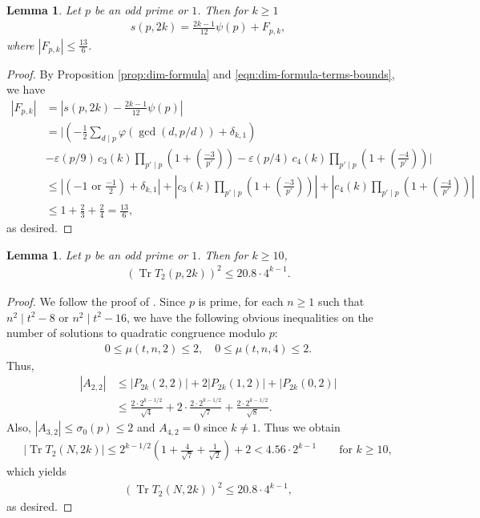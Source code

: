 \documentclass[11pt,letterpaper,reqno]{amsart}
\numberwithin{figure}{section}
\numberwithin{table}{section}
\theoremstyle{definition}
\theoremstyle{plain}
\newcommand{\lrabs}[1]{\left\lvert #1 \right\lvert}
\newcommand{\lrp}[1]{\left(#1\right)}
\newtheorem{lemma}[theorem]{Lemma}
\theoremstyle{definition}
\theoremstyle{definition}
\theoremstyle{remark}
\numberwithin{equation}{section}
\DeclareMathOperator{\Tr}{Tr}
\begin{document}
\begin{lemma} \label{lem:primedimension}
    Let $p$ be an odd prime or $1$. Then for $k\ge1$
    \begin{align}
        s(p,2k)=\frac{2k-1}{12}\psi(p)+F_{p,k},
    \end{align}
    where $|F_{p,k}|\le\frac{13}{6}$.
\end{lemma}
\begin{proof}
    By Proposition \ref{prop:dim-formula} and \eqref{eqn:dim-formula-terms-bounds}, we have
    \begin{align}
        |F_{p,k}| &= \lrabs{s(p,2k) - \frac{2k-1}{12} \psi(p)} \\
        &= \Bigg| \lrp{-\frac12  \sum_{d\mid p} \varphi(\gcd(d,p/d)) + \delta_{k,1}} \\
        & - \varepsilon(p/9)\, c_3(k) \prod_{p' \mid p} \lrp{1 + \lrp{\frac{-3}{p'}} } 
        - \varepsilon(p/4)\, c_4(k) \prod_{p' \mid p} \lrp{1 + \lrp{\frac{-4}{p'}} } \Bigg| \\
        &\leq \lrabs{\lrp{-1 \text{ or } \frac{-1}{2}} + \delta_{k,1}} + \lrabs{c_3(k) \prod_{p' \mid p} \lrp{1 + \lrp{\frac{-3}{p'}} } } + \lrabs{ c_4(k) \prod_{p' \mid p} \lrp{1 + \lrp{\frac{-4}{p'}} } } \\
        &\leq 1 + \frac23 + \frac24 = \frac{13}{6},
    \end{align}
    as desired.
\end{proof}
    


\begin{lemma} \label{lem:primeT2}
    Let $p$ be an odd prime or $1$. Then for $k\ge10$, 
    \begin{align}
        (\Tr T_2(p, 2k))^2\leq 20.8 \cdot 4^{k-1}. 
    \end{align}
\end{lemma}
\begin{proof}
  We follow the proof of \cite[Proposition 4.6]{previousPaper}. Since $p$ is prime,   for each $n\ge1$ such that $n^2\mid t^2-8$ or $n^2\mid t^2-16$, we have the following obvious inequalities on the number of solutions to quadratic congruence modulo $p$:
   \begin{align}
       0\le\mu(t,n,2)\le2, \quad 0\le\mu(t,n,4)\le2.
   \end{align}
   Thus, 
   \begin{align}
       |A_{2,2}|&\le |P_{2k}(2,2)|+2|P_{2k}(1,2)|+|P_{2k}(0,2)|\\
       &\le \frac{2\cdot 2^{k-1/2}}{\sqrt{4}}+2\cdot \frac{2\cdot 2^{k-1/2}}{\sqrt{7}}+\frac{2\cdot 2^{k-1/2}}{\sqrt{8}}.
   \end{align}
   Also,  $|A_{3,2}| \le \sigma_0(p)\le 2$ and $A_{4,2}=0$ since $k\ne1$. Thus we obtain 
   \begin{align}
    |\Tr T_2(N, 2k)|\leq 2^{k-1/2}\left(1+\frac{4}{\sqrt{7}}+\frac{1}{\sqrt{2}}\right)+2 <  4.56 \cdot 2^{k-1} \qquad \text{for } k \ge 10,
   \end{align}
   which yields 
   \begin{align}
       (\Tr T_2(N, 2k))^2 \leq 20.8 \cdot 4^{k-1},
   \end{align}
   as desired.
\end{proof}
\end{document}
